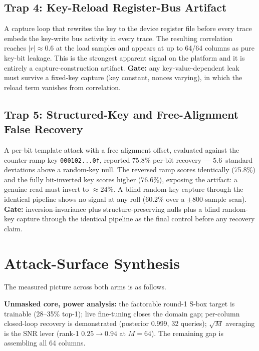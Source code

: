 \documentclass[conference]{IEEEtran}
\begin{document}
\subsection{Trap 4: Key-Reload Register-Bus Artifact}

A capture loop that rewrites the key to the device register
file before every trace embeds the key-write bus activity in
every trace. The resulting correlation reaches $|r|\approx0.6$
at the load samples and appears at up to 64/64 columns as pure
key-bit leakage. This is the strongest apparent signal on the
platform and it is entirely a capture-construction artifact.
\textbf{Gate:} any key-value-dependent leak must survive a
fixed-key capture (key constant, nonces varying), in which the
reload term vanishes from correlation.

\subsection{Trap 5: Structured-Key and Free-Alignment False
Recovery}

A per-bit template attack with a free alignment offset,
evaluated against the counter-ramp key
\texttt{000102...0f}, reported 75.8\% per-bit recovery —
5.6~standard deviations above a random-key null. The
reversed ramp scores identically (75.8\%) and the fully
bit-inverted key scores higher (76.6\%), exposing the artifact:
a genuine read must invert to $\approx24\%$. A blind random-key
capture through the identical pipeline shows no signal at any
roll (60.2\% over a $\pm800$-sample scan).
\textbf{Gate:} inversion-invariance plus structure-preserving
nulls plus a blind random-key capture through the identical
pipeline as the final control before any recovery claim.

\section{Attack-Surface Synthesis}
\label{sec:synthesis}

The measured picture across both arms is as follows.

\textbf{Unmasked core, power analysis:} the factorable round-1
S-box target is trainable (28--35\% top-1); live fine-tuning
closes the domain gap; per-column closed-loop recovery is
demonstrated (posterior 0.999, 32 queries); $\sqrt{M}$
averaging is the SNR lever (rank-1 $0.25\!\to\!0.94$ at
$M\!=\!64$). The remaining gap is assembling all 64 columns.
\end{document}
